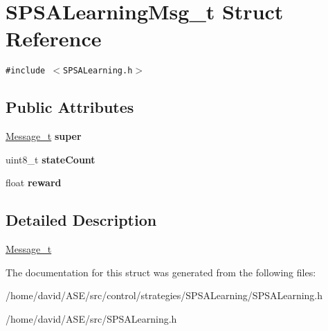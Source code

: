 \hypertarget{structSPSALearningMsg__t}{
\section{SPSALearningMsg\_\-t Struct Reference}
\label{structSPSALearningMsg__t}
}
{\tt \#include $<$SPSALearning.h$>$}

\subsection*{Public Attributes}
\begin{CompactItemize}
\item 
\hypertarget{structSPSALearningMsg__t_e45b1963734c38e9319ed8f2b7537c5e}{
\hyperlink{structMessage__t}{Message\_\-t} \textbf{super}}
\label{structSPSALearningMsg__t_e45b1963734c38e9319ed8f2b7537c5e}

\item 
\hypertarget{structSPSALearningMsg__t_63ac4784a536302d8e9f86f7fd1c801a}{
uint8\_\-t \textbf{stateCount}}
\label{structSPSALearningMsg__t_63ac4784a536302d8e9f86f7fd1c801a}

\item 
\hypertarget{structSPSALearningMsg__t_b892b3dbbf9b9be7c7eeda8e15e02f14}{
float \textbf{reward}}
\label{structSPSALearningMsg__t_b892b3dbbf9b9be7c7eeda8e15e02f14}

\end{CompactItemize}


\subsection{Detailed Description}
\hyperlink{structMessage__t}{Message\_\-t} 

The documentation for this struct was generated from the following files:\begin{CompactItemize}
\item 
/home/david/ASE/src/control/strategies/SPSALearning/SPSALearning.h\item 
/home/david/ASE/src/SPSALearning.h\end{CompactItemize}
